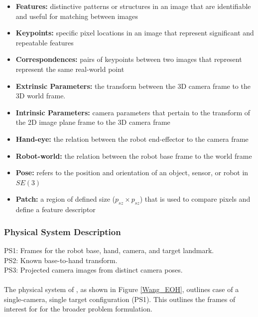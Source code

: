 \documentclass[12pt]{article}
\begin{document}
\begin{itemize}

\item \textbf{Features:} distinctive patterns or structures in an image that are 
identifiable and useful for matching between images

\item \textbf{Keypoints:} specific pixel locations in an image that represent 
significant and repeatable features
\item \textbf{Correspondences:} pairs of keypoints between two images that represent 
represent the same real-world point
\item \textbf{Extrinsic Parameters:} the transform between the 3D camera frame to the 
3D world frame.
\item \textbf{Intrinsic Parameters:} camera parameters that pertain to the transform of the 
2D image plane frame to the 3D camera frame
\item \textbf{Hand-eye:} the relation between the robot end-effector to the camera frame
\item \textbf{Robot-world:} the relation between the robot base frame to the world frame
\item \textbf{Pose:} refers to the position and orientation of an object, sensor, or robot in $SE(3)$
\item \textbf{Patch:} a region of defined size ($p_{sz} \times p_{sz}$) that is used to compare pixels and define a feature descriptor
\end{itemize}


\subsubsection{Physical System Description} \label{sec_phySystDescrip}
\noindent\label{PS_1}PS1: Frames for the robot base, hand, camera, and target landmark.\\
\noindent\label{PS_2}PS2: Known base-to-hand transform.\\
\noindent\label{PS_3}PS3: Projected camera images from distinct camera poses.\\ \\
The physical system of \progname{}, as shown in Figure \ref{Wang_EOH}, outlines 
case of a single-camera, single target configuration (PS1). This outlines the frames of 
interest for for the broader problem formulation. \\
\end{document}
